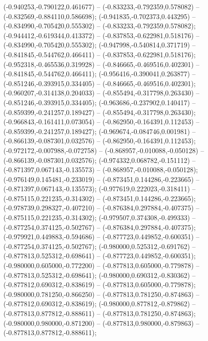  (-0.940253,-0.790122,0.461677) -- (-0.833233,-0.792359,0.578082) -- (-0.832569,-0.884110,0.586698);
 (-0.941835,-0.702373,0.443295) -- (-0.834990,-0.705420,0.555302) -- (-0.833233,-0.792359,0.578082);
 (-0.944412,-0.619344,0.413372) -- (-0.837853,-0.622981,0.518176) -- (-0.834990,-0.705420,0.555302);
 (-0.947998,-0.540814,0.371719) -- (-0.841845,-0.544762,0.466411) -- (-0.837853,-0.622981,0.518176);
 (-0.952318,-0.465536,0.319928) -- (-0.846665,-0.469516,0.402301) -- (-0.841845,-0.544762,0.466411);
 (-0.956416,-0.390041,0.263877) -- (-0.851246,-0.393915,0.334405) -- (-0.846665,-0.469516,0.402301);
 (-0.960207,-0.314138,0.204033) -- (-0.855494,-0.317798,0.263430) -- (-0.851246,-0.393915,0.334405);
 (-0.963686,-0.237902,0.140417) -- (-0.859399,-0.241257,0.189427) -- (-0.855494,-0.317798,0.263430);
 (-0.966843,-0.161411,0.073054) -- (-0.862950,-0.164391,0.112453) -- (-0.859399,-0.241257,0.189427);
 (-0.969674,-0.084746,0.001981) -- (-0.866139,-0.087301,0.032576) -- (-0.862950,-0.164391,0.112453);
 (-0.972172,-0.007988,-0.072758) -- (-0.868957,-0.010088,-0.050128) -- (-0.866139,-0.087301,0.032576);
 (-0.974332,0.068782,-0.151112) -- (-0.871397,0.067143,-0.135573) -- (-0.868957,-0.010088,-0.050128);
 (-0.976149,0.145481,-0.233019) -- (-0.873451,0.144286,-0.223665) -- (-0.871397,0.067143,-0.135573);
 (-0.977619,0.222023,-0.318411) -- (-0.875115,0.221235,-0.314302) -- (-0.873451,0.144286,-0.223665);
 (-0.978739,0.298327,-0.407210) -- (-0.876384,0.297884,-0.407375) -- (-0.875115,0.221235,-0.314302);
 (-0.979507,0.374308,-0.499333) -- (-0.877254,0.374125,-0.502767) -- (-0.876384,0.297884,-0.407375);
 (-0.979921,0.449883,-0.594686) -- (-0.877723,0.449852,-0.600351) -- (-0.877254,0.374125,-0.502767);
 (-0.980000,0.525312,-0.691762) -- (-0.877813,0.525312,-0.698641) -- (-0.877723,0.449852,-0.600351);
 (-0.980000,0.605000,-0.772200) -- (-0.877813,0.605000,-0.779878) -- (-0.877813,0.525312,-0.698641);
 (-0.980000,0.690312,-0.830362) -- (-0.877812,0.690312,-0.838619) -- (-0.877813,0.605000,-0.779878);
 (-0.980000,0.781250,-0.866250) -- (-0.877813,0.781250,-0.874863) -- (-0.877812,0.690312,-0.838619);
 (-0.980000,0.877812,-0.879862) -- (-0.877813,0.877812,-0.888611) -- (-0.877813,0.781250,-0.874863);
 (-0.980000,0.980000,-0.871200) -- (-0.877813,0.980000,-0.879863) -- (-0.877813,0.877812,-0.888611);
